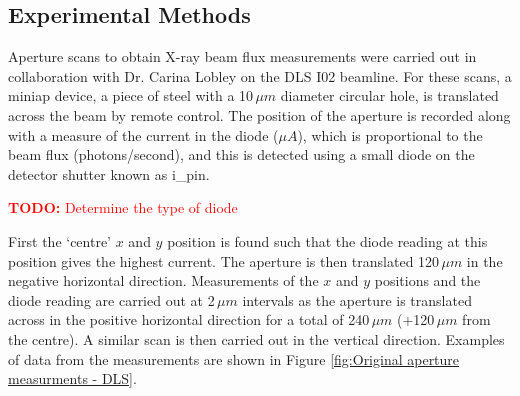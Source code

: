 \subsection{Experimental Methods}
\label{sub:Experimental Methods - DLS}
Aperture scans to obtain X-ray beam flux measurements were carried out in collaboration with Dr. Carina Lobley on the DLS I02 beamline.
For these scans, a miniap device, a piece of steel with a 10$\,\mu m$ diameter circular hole, is translated across the beam by remote control.
The position of the aperture is recorded along with a measure of the current in the diode ($\mu A$), which is proportional to the beam flux (photons/second), and this is detected using a small diode on the detector shutter known as i\_pin.
\textcolor{red}{
    \begin{myenumerate}
        \item \hypertarget{todo:Type of diode}{\textbf{TODO:} Determine the type of diode}
    \end{myenumerate}
}
First the `centre' $x$ and $y$ position is found such that the diode reading at this position gives the highest current.
The aperture is then translated 120$\,\mu m$ in the negative horizontal direction.
Measurements of the $x$ and $y$ positions and the diode reading are carried out at 2$\,\mu m$ intervals as the aperture is translated across in the positive horizontal direction for a total of 240$\,\mu m$ (+120$\,\mu m$ from the centre).
A similar scan is then carried out in the vertical direction.
Examples of data from the measurements are shown in Figure \ref{fig:Original aperture measurments - DLS}.
